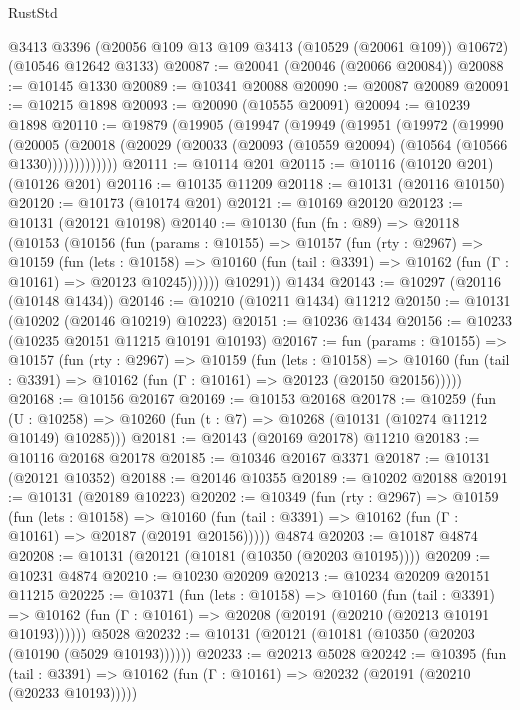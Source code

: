 \begin{lexlean}{RustStd}
\begin{coremodule}
    @3413
    @3396
    (@20056 @109 @13 @109 @3413 (@10529 (@20061 @109)) @10672)
    (@10546 @12642 @3133)
@20087 := @20041 (@20046 (@20066 @20084))
@20088 := @10145 @1330
@20089 := @10341 @20088
@20090 := @20087 @20089
@20091 := @10215 @1898
@20093 := @20090 (@10555 @20091)
@20094 := @10239 @1898
@20110 := @19879
    (@19905
      (@19947
        (@19949
          (@19951
            (@19972
              (@19990
                (@20005
                  (@20018 (@20029 (@20033 (@20093 (@10559 @20094) (@10564 (@10566 @1330)))))))))))))
@20111 := @10114 @201
@20115 := @10116 (@10120 @201) (@10126 @201)
@20116 := @10135 @11209
@20118 := @10131 (@20116 @10150)
@20120 := @10173 (@10174 @201)
@20121 := @10169 @20120
@20123 := @10131 (@20121 @10198)
@20140 := @10130
    (fun (fn : @89) =>
    @20118
      (@10153
        (@10156
          (fun (params : @10155) =>
          @10157
            (fun (rty : @2967) =>
            @10159
              (fun (lets : @10158) =>
              @10160 (fun (tail : @3391) => @10162 (fun (Γ : @10161) => @20123 @10245))))))
        @10291))
    @1434
@20143 := @10297 (@20116 (@10148 @1434))
@20146 := @10210 (@10211 @1434) @11212
@20150 := @10131 (@10202 (@20146 @10219) @10223)
@20151 := @10236 @1434
@20156 := @10233 (@10235 @20151 @11215 @10191 @10193)
@20167 := fun (params : @10155) =>
  @10157
    (fun (rty : @2967) =>
    @10159
      (fun (lets : @10158) =>
      @10160 (fun (tail : @3391) => @10162 (fun (Γ : @10161) => @20123 (@20150 @20156)))))
@20168 := @10156 @20167
@20169 := @10153 @20168
@20178 := @10259
    (fun (U : @10258) => @10260 (fun (t : @7) => @10268 (@10131 (@10274 @11212 @10149) @10285)))
@20181 := @20143 (@20169 @20178) @11210
@20183 := @10116 @20168 @20178
@20185 := @10346 @20167 @3371
@20187 := @10131 (@20121 @10352)
@20188 := @20146 @10355
@20189 := @10202 @20188
@20191 := @10131 (@20189 @10223)
@20202 := @10349
    (fun (rty : @2967) =>
    @10159
      (fun (lets : @10158) =>
      @10160 (fun (tail : @3391) => @10162 (fun (Γ : @10161) => @20187 (@20191 @20156)))))
    @4874
@20203 := @10187 @4874
@20208 := @10131 (@20121 (@10181 (@10350 (@20203 @10195))))
@20209 := @10231 @4874
@20210 := @10230 @20209
@20213 := @10234 @20209 @20151 @11215
@20225 := @10371
    (fun (lets : @10158) =>
    @10160
      (fun (tail : @3391) =>
      @10162 (fun (Γ : @10161) => @20208 (@20191 (@20210 (@20213 @10191 @10193))))))
    @5028
@20232 := @10131 (@20121 (@10181 (@10350 (@20203 (@10190 (@5029 @10193))))))
@20233 := @20213 @5028
@20242 := @10395
    (fun (tail : @3391) => @10162 (fun (Γ : @10161) => @20232 (@20191 (@20210 (@20233 @10193)))))

\end{coremodule}
\end{lexlean}
